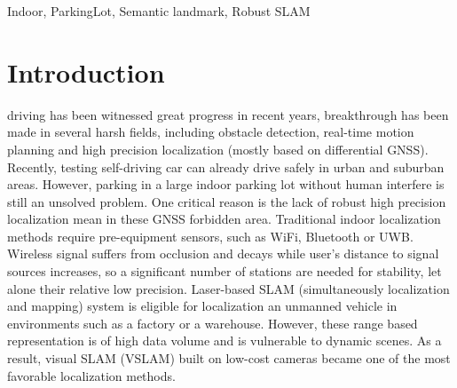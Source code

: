 \documentclass[journal]{IEEEtran}
\begin{document}
\begin{IEEEkeywords}
Indoor, ParkingLot, Semantic landmark, Robust SLAM
\end{IEEEkeywords}






%
\IEEEpeerreviewmaketitle



\section{Introduction}
% 
% 
% 
% 


 driving has been witnessed great progress in recent years, breakthrough has been made in several harsh fields, including obstacle detection, real-time motion planning and high precision localization (mostly based on differential GNSS).
Recently, testing self-driving car can already drive safely in urban and suburban areas\citep{DARPA WAYMO}. 
However, parking in a large indoor parking lot without human interfere is still an unsolved problem.
One critical reason is the lack of robust high precision localization mean in these GNSS forbidden area.
Traditional indoor localization methods require pre-equipment sensors, such as WiFi, Bluetooth or UWB. 
Wireless signal suffers from occlusion and decays while user’s distance to signal sources increases, so a significant number of stations are needed for stability, let alone their relative low precision\citep{WIFI bluetooth UWB}. 
Laser-based SLAM (simultaneously localization and mapping) system is eligible for localization an unmanned vehicle in environments such as a factory or a warehouse\citep{REFERNCE}.
However, these range based representation is of high data volume and is vulnerable to dynamic scenes.
As a result, visual SLAM (VSLAM) built on low-cost cameras became one of the most favorable localization methods.
\end{document}
